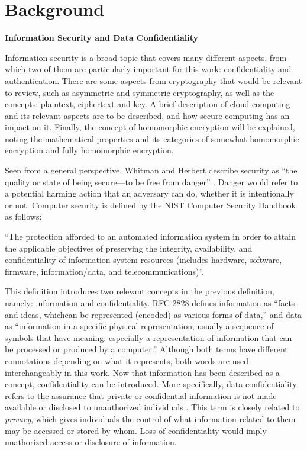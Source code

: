 \chapter{Background}
\label{background}

\textbf{Information Security and Data Confidentiality}

Information security is a broad topic that covers many different aspects, from which two of them are particularly important for this work: confidentiality and authentication. There are some aspects from cryptography that would be relevant to review, such as asymmetric and symmetric cryptography, as well as the concepts: plaintext, ciphertext and key. A brief description of cloud computing and its relevant aspects are to be described, and how secure computing has an impact on it. Finally, the concept of homomorphic encryption will be explained, noting the mathematical properties and its categories of somewhat homomorphic encryption and fully homomorphic encryption.

Seen from a general perspective, Whitman and Herbert describe security as ``the quality or state of being secure---to be free from danger'' \cite{PrinciplesInformationSecurity}. Danger would refer to a potential harming action that an adversary can do, whether it is intentionally or not. Computer security is defined by the NIST Computer Security Handbook as follows:

``The protection afforded to an automated information system in order to attain the applicable objectives of preserving the integrity, availability, and confidentiality of information system resources (includes hardware, software, firmware, information/data, and telecommunications)''.

This definition introduces two relevant concepts in the previous definition, namely: information and confidentiality. RFC 2828 defines information as ``facts and ideas, whichcan be represented (encoded) as various forms of data,'' and data as ``information in a specific physical representation, usually a sequence of symbols that have meaning: especially a representation of information that can be processed or produced by a computer.'' Although both terms have different connotations depending on what it represents, both words are used interchangeably in this work. Now that information has been described as a concept, confidentiality can be introduced. More specifically, data confidentiality refers to the assurance that private or confidential information is not made available or disclosed to unauthorized individuals \cite{CryptoStallings}. This term is closely related to \textit{privacy}, which gives individuals the control of what information related to them may be accessed or stored by whom. Loss of confidentiality would imply unathorized access or disclosure of information.

